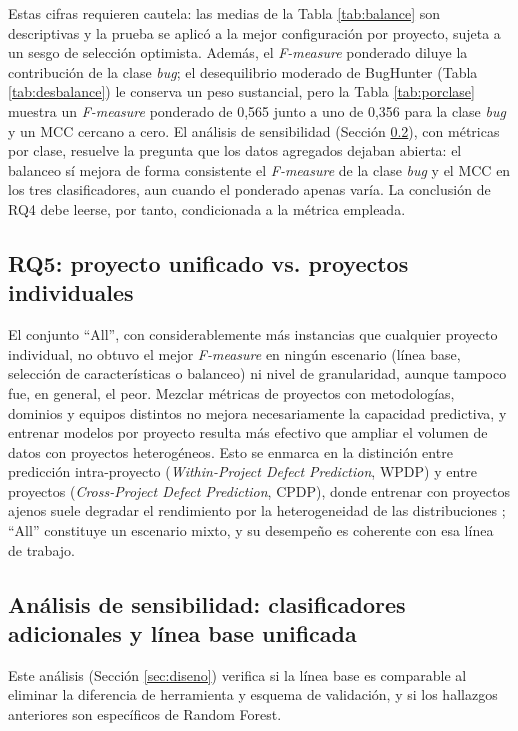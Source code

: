\documentclass[conference,a4paper]{IEEEtran}
\begin{document}
Estas cifras requieren cautela: las medias de la Tabla \ref{tab:balance} son descriptivas y la prueba se aplicó a la mejor configuración por proyecto, sujeta a un sesgo de selección optimista. Además, el \textit{F-measure} ponderado diluye la contribución de la clase \textit{bug}; el desequilibrio moderado de BugHunter (Tabla \ref{tab:desbalance}) le conserva un peso sustancial, pero la Tabla \ref{tab:porclase} muestra un \textit{F-measure} ponderado de 0,565 junto a uno de 0,356 para la clase \textit{bug} y un MCC cercano a cero. El análisis de sensibilidad (Sección \ref{sec:sensibilidad}), con métricas por clase, resuelve la pregunta que los datos agregados dejaban abierta: el balanceo sí mejora de forma consistente el \textit{F-measure} de la clase \textit{bug} y el MCC en los tres clasificadores, aun cuando el ponderado apenas varía. La conclusión de RQ4 debe leerse, por tanto, condicionada a la métrica empleada.

\subsection{RQ5: proyecto unificado vs. proyectos individuales}

El conjunto ``All'', con considerablemente más instancias que cualquier proyecto individual, no obtuvo el mejor \textit{F-measure} en ningún escenario (línea base, selección de características o balanceo) ni nivel de granularidad, aunque tampoco fue, en general, el peor. Mezclar métricas de proyectos con metodologías, dominios y equipos distintos no mejora necesariamente la capacidad predictiva, y entrenar modelos por proyecto resulta más efectivo que ampliar el volumen de datos con proyectos heterogéneos. Esto se enmarca en la distinción entre predicción intra-proyecto (\textit{Within-Project Defect Prediction}, WPDP) y entre proyectos (\textit{Cross-Project Defect Prediction}, CPDP), donde entrenar con proyectos ajenos suele degradar el rendimiento por la heterogeneidad de las distribuciones \cite{cheng2022,sharma2023far}; ``All'' constituye un escenario mixto, y su desempeño es coherente con esa línea de trabajo.

\subsection{Análisis de sensibilidad: clasificadores adicionales y línea base unificada}
\label{sec:sensibilidad}

Este análisis (Sección \ref{sec:diseno}) verifica si la línea base es comparable al eliminar la diferencia de herramienta y esquema de validación, y si los hallazgos anteriores son específicos de Random Forest.
\end{document}
